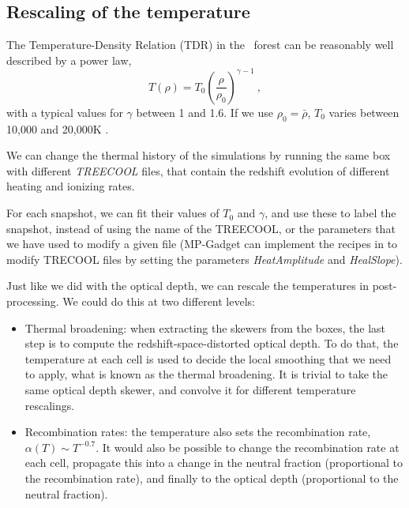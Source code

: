 \subsection{Rescaling of the temperature}

The Temperature-Density Relation (TDR) in the \lya\ forest can be reasonably
well described by a power law, 
\begin{equation}
 T(\rho) = T_0 \left(\frac{\rho}{\rho_0}\right)^{\gamma-1} ~,
\end{equation}
with a typical values for $\gamma$ between 1 and 1.6. 
If we use $\rho_0 = \bar \rho$, $T_0$ varies between 10,000 and 20,000K
\cite{Lukic2015}.

We can change the thermal history of the simulations by running the same box
with different \textit{TREECOOL} files, that contain the redshift evolution
of different heating and ionizing rates.

For each snapshot, we can fit their values of $T_0$ and $\gamma$, and use 
these to label the snapshot, instead of using the name of the TREECOOL, 
or the parameters that we have used to modify a given file 
(MP-Gadget can implement the recipes in \cite{Bolton2008} to modify TRECOOL
files by setting the parameters \textit{HeatAmplitude} and \textit{HealSlope}).

Just like we did with the optical depth, we can rescale the temperatures in 
post-processing. 
We could do this at two different levels:
\begin{itemize}
 \item Thermal broadening: when extracting the skewers from the boxes, 
  the last step is to compute the redshift-space-distorted optical depth. 
  To do that, the temperature at each cell is used to decide the local 
  smoothing that we need to apply, what is known as the thermal broadening. 
  It is trivial to take the same optical depth skewer, and convolve it for
  different temperature rescalings.
 \item Recombination rates: the temperature also sets the recombination rate,
  $\alpha(T) \sim T^{-0.7}$. 
  It would also be possible to change the recombination rate at each cell, 
  propagate this into a change in the neutral fraction (proportional to the 
  recombination rate), and finally to the optical depth (proportional to the 
  neutral fraction).
\end{itemize}

